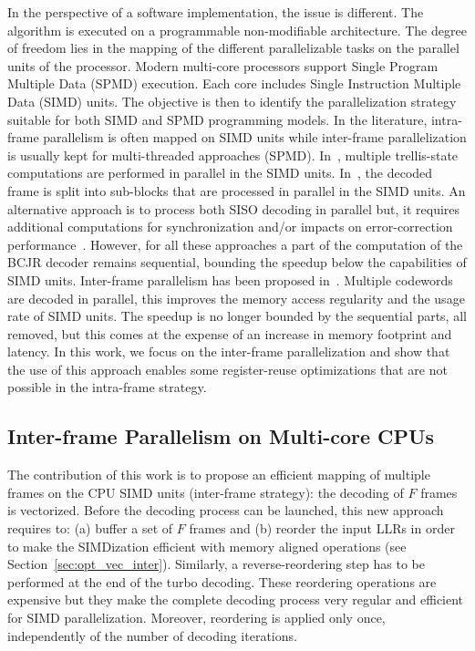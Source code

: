 In the perspective of a software implementation, the issue is different. The
algorithm is executed on a programmable non-modifiable architecture. The degree
of freedom lies in the mapping of the different parallelizable tasks on the
parallel units of the processor. Modern multi-core processors support Single
Program Multiple Data (SPMD) execution. Each core includes Single Instruction
Multiple Data (SIMD) units. The objective is then to identify the
parallelization strategy suitable for both SIMD and SPMD programming models.
In the literature, intra-frame parallelism is often mapped on SIMD units while
inter-frame parallelization is usually kept for multi-threaded approaches
(SPMD). In~\cite{Zhang2012,Wu2013}, multiple trellis-state computations are
performed in parallel in the SIMD units. In~\cite{Wu2010,Wu2011,Chinnici2012,
Yoge2012,Zhang2012,Liu2013,Chen2013,Xianjun2013,Wu2013,Zhang2014,Li2014}, the
decoded frame is split into sub-blocks that are processed in parallel in the
SIMD units. An alternative approach is to process both SISO decoding in
parallel but, it requires additional computations for synchronization and/or
impacts on error-correction performance~\cite{Muller2009}. However, for all
these approaches a part of the computation of the BCJR decoder remains
sequential, bounding the speedup below the capabilities of SIMD units.
Inter-frame parallelism has been proposed in~\cite{Wu2010,Wu2011,Zhang2012,
Wu2013}. Multiple codewords are decoded in parallel, this improves the memory
access regularity and the usage rate of SIMD units. The speedup is no longer
bounded by the sequential parts, all removed, but this comes at the expense of
an increase in memory footprint and latency.
In this work, we focus on the inter-frame parallelization and show that the use
of this approach enables some register-reuse optimizations that are not possible
in the intra-frame strategy.

\subsection{Inter-frame Parallelism on Multi-core CPUs}

The contribution of this work is to propose an efficient mapping of multiple
frames on the CPU SIMD units (inter-frame strategy): the decoding of $F$ frames
is vectorized. Before the decoding process can be launched, this new approach
requires to: (a) buffer a set of $F$ frames and (b) reorder the input LLRs in
order to make the SIMDization efficient with memory aligned operations (see
Section~\ref{sec:opt_vec_inter}). Similarly, a reverse-reordering step has to be
performed at the end of the turbo decoding. These reordering operations are
expensive but they make the complete decoding process very regular and efficient
for SIMD parallelization. Moreover, reordering is applied only once,
independently of the number of decoding iterations.

